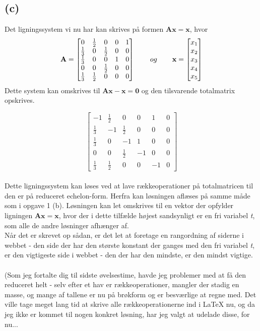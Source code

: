 \documentclass[12pt]{article}
\begin{document}
\subsection{(c)} Det ligningssystem vi nu har kan skrives på formen $\mathbf{Ax=x}$, hvor
$$
\mathbf{A}=
\begin{bmatrix}
0&\frac{1}{2}&0&0&1\\
\frac{1}{3}&0&\frac{1}{2}&0&0\\
\frac{1}{3}&0&0&1&0\\
0&0&\frac{1}{2}&0&0\\
\frac{1}{3}&\frac{1}{2}&0&0&0
\end{bmatrix} \hspace*{5ex} og \hspace*{5ex}
\mathbf{x}=
\begin{bmatrix}
x_1\\
x_2\\
x_3\\
x_4\\
x_5
\end{bmatrix}
$$
Dette system kan omskrives til $\mathbf{Ax-x=0}$ og den tilsvarende totalmatrix opskrives.

$$
\left[\begin{array}{rrrrr|r}
-1&\frac{1}{2}&0&0&1&0\\
\frac{1}{3}&-1&\frac{1}{2}&0&0&0\\
\frac{1}{3}&0&-1&1&0&0\\
0&0&\frac{1}{2}&-1&0&0\\
\frac{1}{3}&\frac{1}{2}&0&0&-1&0
\end{array}\right]
$$\\

Dette ligningssystem kan løses ved at lave rækkeoperationer på totalmatricen til den er på reduceret echelon-form. Herfra kan løsningen aflæses på samme måde som i opgave 1 (b). Løsningen kan let omskrives til en vektor der opfylder ligningen $\mathbf{Ax=x}$, hvor der i dette tilfælde højest sandsynligt er en fri variabel \textit{t}, som alle de andre løsninger afhænger af. \\
Når det er skrevet op sådan, er det let at foretage en rangordning af siderne i webbet - den side der har den største konstant der ganges med den fri variabel \textit{t}, er den vigtigeste side i webbet - den der har den mindste, er den mindst vigtige. \\\\
(Som jeg fortalte dig til sidste øvelsestime, havde jeg problemer med at få den reduceret helt - selv efter et hav er rækkeoperationer, mangler der stadig en masse, og mange af tallene er nu på brøkform og er besværlige at regne med. Det ville tage meget lang tid at skrive alle rækkeoperationerne ind i LaTeX nu, og da jeg ikke er kommet til nogen konkret løsning, har jeg valgt at udelade disse, for nu...
\end{document}
